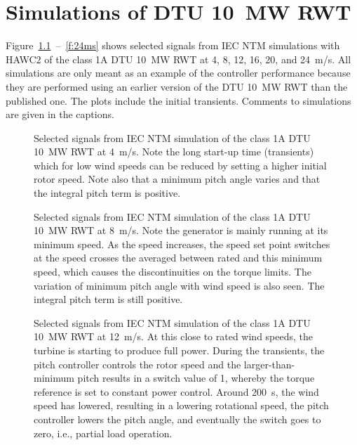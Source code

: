 \chapter{Simulations of DTU 10~MW RWT}

Figure~\ref{f:4ms}~--~\ref{f:24ms} shows selected signals from IEC NTM simulations with HAWC2 of the class 1A DTU 10~MW RWT at 4, 8, 12, 16, 20, and 24~m/s. All simulations are only meant as an example of the controller performance because they are performed using an earlier version of the DTU 10~MW RWT than the published one. The plots include the initial transients. Comments to simulations are given in the captions.


\begin{figure}[t]
\centerline{ }
\caption{Selected signals from IEC NTM simulation of the class 1A DTU 10~MW RWT at 4~m/s. Note the long start-up time (transients) which for low wind speeds can be reduced by setting a higher initial rotor speed. Note also that a minimum pitch angle varies and that the integral pitch term is positive. \label{f:4ms}}
\end{figure}


\begin{figure}[t]
\centerline{ }
\caption{Selected signals from IEC NTM simulation of the class 1A DTU 10~MW RWT at 8~m/s. Note the generator is mainly running at its minimum speed. As the speed increases, the speed set point switches at the speed crosses the averaged between rated and this minimum speed, which causes the discontinuities on the torque limits. The variation of minimum pitch angle with wind speed is also seen. The integral pitch term is still positive. \label{f:8ms}}
\end{figure}


\begin{figure}[t]
\centerline{ }
\caption{Selected signals from IEC NTM simulation of the class 1A DTU 10~MW RWT at 12~m/s. At this close to rated wind speeds, the turbine is starting to produce full power. During the transients, the pitch controller controls the rotor speed and the larger-than-minimum pitch results in a switch value of 1, whereby the torque reference is set to constant power control. Around 200~s, the wind speed has lowered, resulting in a lowering rotational speed, the pitch controller lowers the pitch angle, and eventually the switch goes to zero, i.e., partial load operation. \label{f:12ms}}
\end{figure}


